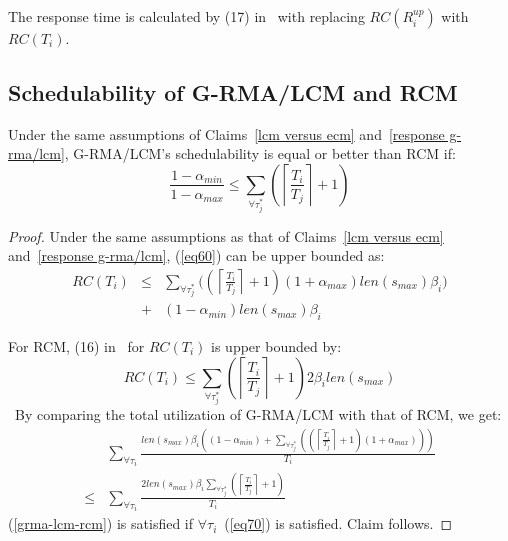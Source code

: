 The response time is calculated by (17) in~\cite{stmconcurrencycontrol:emsoft11} with replacing $RC(R_i^{up})$ with $RC(T_i)$.

\subsection{Schedulability of G-RMA/LCM and RCM}
\label{rma eval}

\begin{clm}\label{rma_eval_clm}
Under the same assumptions of Claims~\ref{lcm versus ecm} and~\ref{response g-rma/lcm}, G-RMA/LCM's schedulability is equal or better than RCM if:
\begin{equation}
\frac{1-\alpha_{min}}{1-\alpha_{max}}\le \sum_{\forall \tau_j^*}\left( \left\lceil\frac{T_i}{T_j}\right\rceil +1 \right)
\label{eq70}\end{equation}
\end{clm}

\begin{proof}
Under the same assumptions as that of Claims~\ref{lcm versus ecm} and~\ref{response g-rma/lcm}, (\ref{eq60}) can be upper bounded as:
\begin{eqnarray}
RC(T_i) & \le & \sum_{\forall \tau_{j}^{*}}\bigg(\left(\left\lceil\frac{T_{i}}{T_{j}}\right\rceil +1\right)(1+\alpha_{max})
 len(s_{max})\beta_{i}\bigg)\nonumber\\
 & + & (1-\alpha_{min})len(s_{max})\beta_{i}\label{eq68}\end{eqnarray}
 
For RCM, (16) in~\cite{stmconcurrencycontrol:emsoft11} for $RC(T_{i})$ is upper bounded by:
\begin{equation*}
RC(T_{i})\le\sum_{\forall \tau_{j}^{*}}\left(\left\lceil\frac{T_{i}}{T_{j}}\right\rceil +1\right)2\beta_{i}len(s_{max})\label{eq69}\end{equation*}\
By comparing the total utilization of G-RMA/LCM with that of RCM,
we get:
\begin{eqnarray}
 & \sum_{\forall\tau_{i}}\frac{len\left(s_{max}\right)\beta_{i}\left(\left(1-\alpha_{min}\right)+\sum_{\forall\tau_{j}^{*}}\left(\left(\left\lceil\frac{T_{i}}{T_{j}}\right\rceil+1\right)\left(1+\alpha_{max}\right)\right)\right)}{T_{i}}\nonumber\\
\le & \sum_{\forall\tau_{i}}\frac{2len\left(s_{max}\right)\beta_{i}\sum_{\forall\tau_{j}^{*}}\left(\left\lceil\frac{T_{i}}{T_{j}}\right\rceil+1\right)}{T_{i}}\label{grma-lcm-rcm}\end{eqnarray}
(\ref{grma-lcm-rcm}) is satisfied if $\forall \tau_i$~(\ref{eq70}) is satisfied. Claim follows.
\end{proof}

